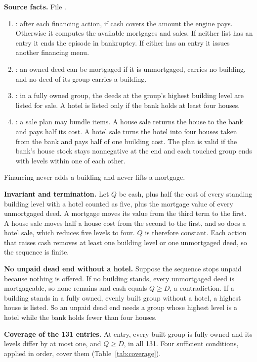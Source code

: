 \textbf{Source facts.} File .
\begin{enumerate}
\item {}: after each financing action, if cash covers the amount the engine pays. Otherwise it computes the available mortgages and sales. If neither list has an entry it ends the episode in bankruptcy. If either has an entry it issues another financing menu.
\item {}: an owned deed can be mortgaged if it is unmortgaged, carries no building, and no deed of its group carries a building.
\item {}: in a fully owned group, the deeds at the group's highest building level are listed for sale. A hotel is listed only if the bank holds at least four houses.
\item {}: a sale plan may bundle items. A house sale returns the house to the bank and pays half its cost. A hotel sale turns the hotel into four houses taken from the bank and pays half of one building cost. The plan is valid if the bank's house stock stays nonnegative at the end and each touched group ends with levels within one of each other.
\end{enumerate}
Financing never adds a building and never lifts a mortgage.

\textbf{Invariant and termination.} Let $Q$ be cash, plus half the cost of every standing building level with a hotel counted as five, plus the mortgage value of every unmortgaged deed. A mortgage moves its value from the third term to the first. A house sale moves half a house cost from the second to the first, and so does a hotel sale, which reduces five levels to four. $Q$ is therefore constant. Each action that raises cash removes at least one building level or one unmortgaged deed, so the sequence is finite.

\textbf{No unpaid dead end without a hotel.} Suppose the sequence stops unpaid because nothing is offered. If no building stands, every unmortgaged deed is mortgageable, so none remains and cash equals $Q\ge D$, a contradiction. If a building stands in a fully owned, evenly built group without a hotel, a highest house is listed. So an unpaid dead end needs a group whose highest level is a hotel while the bank holds fewer than four houses.

\textbf{Coverage of the 131 entries.} At entry, every built group is fully owned and its levels differ by at most one, and $Q\ge D$, in all 131. Four sufficient conditions, applied in order, cover them (Table~\ref{tab:coverage}).

